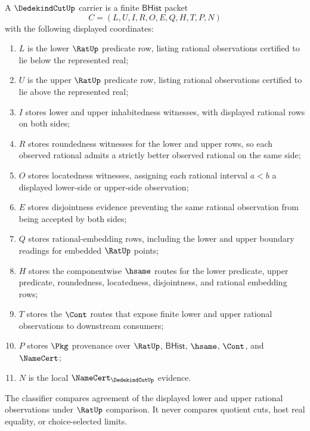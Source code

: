 \begin{definition}
\label{def:dedekindcut-bhist-source}
A $\DedekindCutUp$ carrier is a finite $\mathsf{BHist}$ packet
$$
C=(L,U,I,R,O,E,Q,H,T,P,N)
$$
with the following displayed coordinates:
\begin{enumerate}
\item $L$ is the lower $\RatUp$ predicate row, listing rational observations certified to lie below the represented real;
\item $U$ is the upper $\RatUp$ predicate row, listing rational observations certified to lie above the represented real;
\item $I$ stores lower and upper inhabitedness witnesses, with displayed rational rows on both sides;
\item $R$ stores roundedness witnesses for the lower and upper rows, so each observed rational admits a strictly better observed rational on the same side;
\item $O$ stores locatedness witnesses, assigning each rational interval $a<b$ a displayed lower-side or upper-side observation;
\item $E$ stores disjointness evidence preventing the same rational observation from being accepted by both sides;
\item $Q$ stores rational-embedding rows, including the lower and upper boundary readings for embedded $\RatUp$ points;
\item $H$ stores the componentwise $\hsame$ routes for the lower predicate, upper predicate, roundedness, locatedness, disjointness, and rational embedding rows;
\item $T$ stores the $\Cont$ routes that expose finite lower and upper rational observations to downstream consumers;
\item $P$ stores $\Pkg$ provenance over $\RatUp$, $\mathsf{BHist}$, $\hsame$, $\Cont$, and $\NameCert$;
\item $N$ is the local $\NameCert_{\DedekindCutUp}$ evidence.
\end{enumerate}
The classifier compares agreement of the displayed lower and upper rational observations under $\RatUp$ comparison. It never compares quotient cuts, host real equality, or choice-selected limits.
\end{definition}

